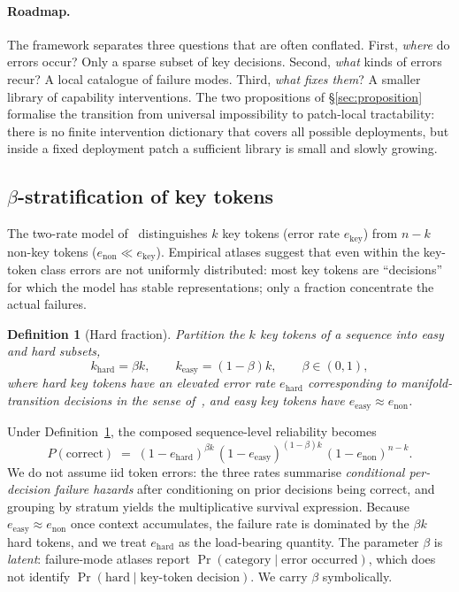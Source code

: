 \documentclass{article}
\theoremstyle{taeplain}
\theoremstyle{taedefn}
\newtheorem{definition}{Definition}
\newcommand{\teApprox}{\ensuremath{\approx}}
\begin{document}
\paragraph{Roadmap.}
The framework separates three questions that are often conflated. First, \emph{where} do errors occur? Only a sparse subset of key decisions. Second, \emph{what} kinds of errors recur? A local catalogue of failure modes. Third, \emph{what fixes them}? A smaller library of capability interventions. The two propositions of \S\ref{sec:proposition} formalise the transition from universal impossibility to patch-local tractability: there is no finite intervention dictionary that covers all possible deployments, but inside a fixed deployment patch a sufficient library is small and slowly growing.

\subsection{$\beta$-stratification of key tokens}

The two-rate model of~\citet{arbuzov2025beyond} distinguishes $k$ key tokens (error rate $e_{\text{key}}$) from $n - k$ non-key tokens ($e_{\text{non}} \ll e_{\text{key}}$). Empirical atlases suggest that even within the key-token class errors are not uniformly distributed: most key tokens are ``decisions'' for which the model has stable representations; only a fraction concentrate the actual failures.

\begin{definition}[Hard fraction]\label{def:hard}
Partition the $k$ key tokens of a sequence into easy and hard subsets,
\[
k_{\text{hard}} = \beta k, \qquad k_{\text{easy}} = (1-\beta) k, \qquad \beta \in (0,1),
\]
where hard key tokens have an elevated error rate $e_{\text{hard}}$ corresponding to manifold-transition decisions in the sense of~\citet[\S3.2]{arbuzov2025beyond}, and easy key tokens have $e_{\text{easy}} \teApprox e_{\text{non}}$.
\end{definition}

Under Definition~\ref{def:hard}, the composed sequence-level reliability becomes
\begin{equation}\label{eq:three-rate}
P(\text{correct}) \;=\; (1 - e_{\text{hard}})^{\beta k}\,(1 - e_{\text{easy}})^{(1 - \beta) k}\,(1 - e_{\text{non}})^{n - k}.
\end{equation}
We do not assume iid token errors: the three rates summarise \emph{conditional per-decision failure hazards} after conditioning on prior decisions being correct, and grouping by stratum yields the multiplicative survival expression. Because $e_{\text{easy}} \teApprox e_{\text{non}}$ once context accumulates, the failure rate is dominated by the $\beta k$ hard tokens, and we treat $e_{\text{hard}}$ as the load-bearing quantity. The parameter $\beta$ is \emph{latent}: failure-mode atlases report $\Pr(\text{category} \mid \text{error occurred})$, which does not identify $\Pr(\text{hard} \mid \text{key-token decision})$. We carry $\beta$ symbolically.
\end{document}
